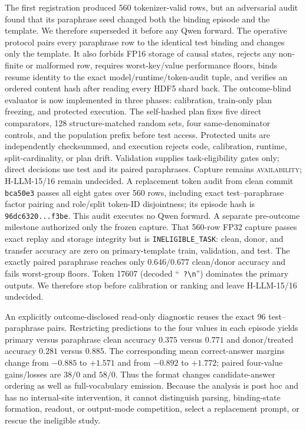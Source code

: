 \documentclass[10pt]{article}
\newcommand{\code}[1]{\texttt{#1}}
\newcommand{\level}[1]{{\scriptsize\textsc{#1}}}
\begin{document}
The first registration produced 560 tokenizer-valid rows, but an adversarial
audit found that its paraphrase seed changed both the binding episode and the
template.  We therefore superseded it before any Qwen forward.  The operative
protocol pairs every paraphrase row to the identical test binding and changes
only the template.  It also forbids FP16 storage of causal states, rejects any
non-finite or malformed row, requires worst-key/value performance floors, binds
resume identity to the exact model/runtime/token-audit tuple, and verifies an
ordered content hash after reading every HDF5 shard back.  The outcome-blind
evaluator is now implemented in three phases: calibration, train-only plan
freezing, and protected execution.  The self-hashed plan fixes five direct
comparators, 128 structure-matched random sets, four same-denominator controls,
and the population prefix before test access.  Protected units are independently
checksummed, and execution rejects code, calibration, runtime, split-cardinality,
or plan drift.  Validation supplies task-eligibility gates only; direct decisions
use test and its paired paraphrases. Capture remains \level{availability};
H-LLM-15/16 remain undecided.  A
replacement token audit from clean commit \code{bca50e3} passes all eight gates
over 560 rows, including exact test--paraphrase factor pairing and role/split
token-ID disjointness; its episode hash is \code{96dc6320...f3be}.  This audit
executes no Qwen forward.  A separate pre-outcome milestone authorized only
the frozen capture.  That 560-row FP32 capture passes exact replay and storage
integrity but is \code{INELIGIBLE\_TASK}: clean, donor, and transfer accuracy
are zero on primary-template train, validation, and test.  The exactly paired
paraphrase reaches only $0.646/0.677$ clean/donor accuracy and fails worst-group
floors.  Token 17607 (decoded ``\texttt{ ?\textbackslash n}'') dominates the
primary outputs.  We therefore stop before calibration or ranking and leave
H-LLM-15/16 undecided.

An explicitly outcome-disclosed read-only diagnostic reuses the exact 96
test--paraphrase pairs.  Restricting predictions to the four values in each
episode yields primary versus paraphrase clean accuracy $0.375$ versus $0.771$
and donor/treated accuracy $0.281$ versus $0.885$.  The corresponding mean
correct-answer margins change from $-0.885$ to $+1.571$ and from $-0.892$ to
$+1.772$; paired four-value gains/losses are $38/0$ and $58/0$.  Thus the
format changes candidate-answer ordering as well as full-vocabulary emission.
Because the analysis is post hoc and has no internal-site intervention, it
cannot distinguish parsing, binding-state formation, readout, or output-mode
competition, select a replacement prompt, or rescue the ineligible study.
\end{document}
